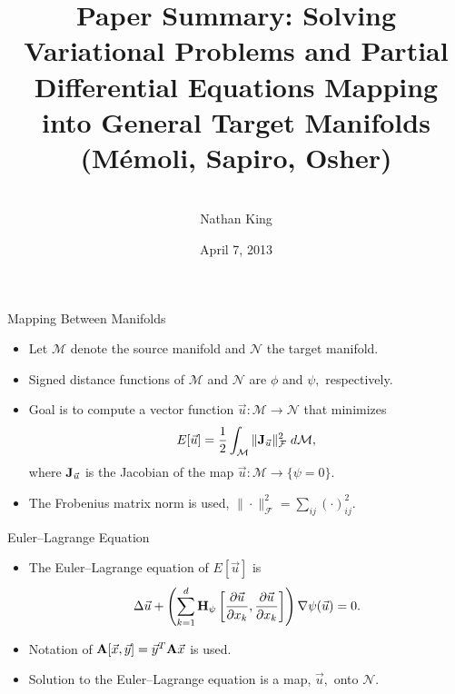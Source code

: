\documentclass{beamer}
\title[Manifold Mapping] %
{Paper Summary: Solving Variational Problems and Partial Differential Equations Mapping into General Target Manifolds (M\'{e}moli, Sapiro, Osher)}
\author[King] %
{\vspace{1cm}\\
Nathan King}
\institute[SFU] %
{
  Department of Mathematics\\
Simon Fraser University\\
 }
\date[April 7, 2013] %
{April 7, 2013}
\begin{document}
  
  
  
\begin{frame}
  \titlepage
\end{frame}







\begin{frame}{Mapping Between Manifolds}
\begin{itemize}
\item Let $\mathcal{M}$ denote the source manifold and $\mathcal{N}$ the target manifold.
\item Signed distance functions of $\mathcal{M}$ and $\mathcal{N}$ are $\phi$ and $\psi,$ respectively.
\item Goal is to compute a vector function $\vec{u} : \mathcal{M} \rightarrow \mathcal{N}$ that minimizes $$E[\vec{u}]=\frac{1}{2} \int_{\mathcal{M}} \| {\bf J}_{\vec{u}}\|^2_{\mathcal{F}} \; d\mathcal{M}, $$ where ${\bf J}_{\vec{u}}$ is the Jacobian of the map $\vec{u} : \mathcal{M}\rightarrow \lbrace \psi  = 0 \rbrace.$
\item The Frobenius matrix norm is used, $\| \cdot \|^2_{\mathcal{F}} = \sum_{ij} (\cdot)^2_{ij}.$
\end{itemize}
\end{frame}

\begin{frame}{Euler--Lagrange Equation}
\begin{itemize}
\item The Euler--Lagrange equation of $E[\vec{u}]$ is 
\begin{equation*}
\Delta \vec{u} + \left( \sum_{k=1}^d {\bf H}_{\psi} \left[\frac{\partial \vec{u}}{\partial x_k} ,\frac{\partial \vec{u}}{\partial x_k}\right] \right) \nabla \psi(\vec{u}) =0.
\end{equation*}
\item Notation of ${\bf A} [\vec{x},\vec{y}] = \vec{y}^T {\bf A} \vec{x}$ is used.
\item Solution to the Euler--Lagrange equation is a map, $\vec{u},$ onto $\mathcal{N}.$
\end{itemize}
\end{frame}
\end{document}
